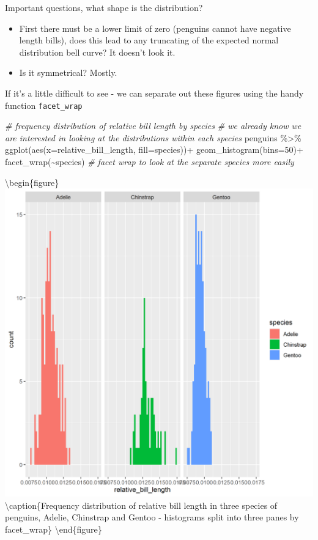 \documentclass[
]{book}
\newenvironment{Shaded}{\begin{snugshade}}{\end{snugshade}}
\newcommand{\AttributeTok}[1]{\textcolor[rgb]{0.77,0.63,0.00}{#1}}
\newcommand{\CommentTok}[1]{\textcolor[rgb]{0.56,0.35,0.01}{\textit{#1}}}
\newcommand{\DecValTok}[1]{\textcolor[rgb]{0.00,0.00,0.81}{#1}}
\newcommand{\FunctionTok}[1]{\textcolor[rgb]{0.00,0.00,0.00}{#1}}
\newcommand{\NormalTok}[1]{#1}
\newcommand{\SpecialCharTok}[1]{\textcolor[rgb]{0.00,0.00,0.00}{#1}}
\begin{document}
Important questions, what shape is the distribution?

\begin{itemize}
\item
  First there must be a lower limit of zero (penguins cannot have negative length bills), does this lead to any truncating of the expected normal distribution bell curve? It doesn't look it.
\item
  Is it symmetrical? Mostly.
\end{itemize}

If it's a little difficult to see - we can separate out these figures using the handy function \texttt{facet\_wrap}

\begin{Shaded}
\begin{Highlighting}[]
\CommentTok{\# frequency distribution of relative bill length by species}
\CommentTok{\# we already know we are interested in looking at the distributions \textquotesingle{}within\textquotesingle{} each species}
\NormalTok{penguins }\SpecialCharTok{\%\textgreater{}\%} 
  \FunctionTok{ggplot}\NormalTok{(}\FunctionTok{aes}\NormalTok{(}\AttributeTok{x=}\NormalTok{relative\_bill\_length, }\AttributeTok{fill=}\NormalTok{species))}\SpecialCharTok{+}
  \FunctionTok{geom\_histogram}\NormalTok{(}\AttributeTok{bins=}\DecValTok{50}\NormalTok{)}\SpecialCharTok{+}
  \FunctionTok{facet\_wrap}\NormalTok{(}\SpecialCharTok{\textasciitilde{}}\NormalTok{species) }\CommentTok{\# facet wrap to look at the separate species more easily}
\end{Highlighting}
\end{Shaded}

\textbackslash begin\{figure\}
\includegraphics[width=1\linewidth]{images/facetdistribution} \textbackslash caption\{Frequency distribution of relative bill length in three species of penguins, Adelie, Chinstrap and Gentoo - histograms split into three panes by facet\_wrap\}\label{fig:unnamed-chunk-99}
\textbackslash end\{figure\}
\end{document}
